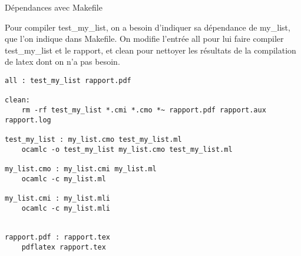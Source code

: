 \documentclass{article}
\theoremstyle{definition}
\begin{document}
\newpage

\begin{section}{Dépendances avec Makefile}

Pour compiler test\_my\_list, on a besoin d'indiquer sa dépendance de my\_list, que l'on indique dans Makefile. On modifie l'entrée all pour lui faire compiler test\_my\_list et le rapport, et clean pour nettoyer les résultats de la compilation de latex dont on n'a pas besoin.

\begin{lstlisting}[language=caml]
all : test_my_list rapport.pdf

clean:
	rm -rf test_my_list *.cmi *.cmo *~ rapport.pdf rapport.aux rapport.log

test_my_list : my_list.cmo test_my_list.ml
	ocamlc -o test_my_list my_list.cmo test_my_list.ml

my_list.cmo : my_list.cmi my_list.ml
	ocamlc -c my_list.ml

my_list.cmi : my_list.mli
	ocamlc -c my_list.mli


rapport.pdf : rapport.tex
	pdflatex rapport.tex
\end{lstlisting}
\end{section}
\end{document}
